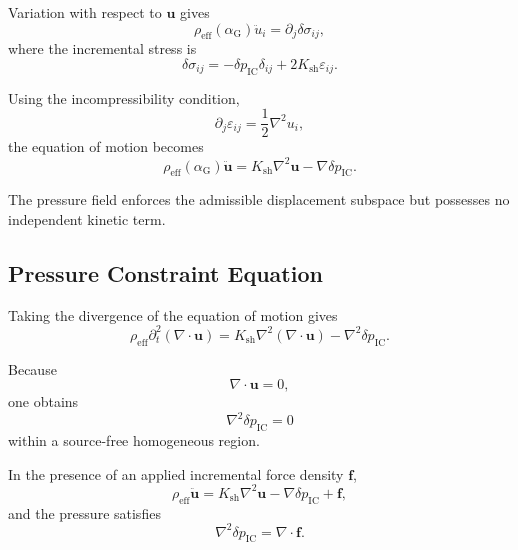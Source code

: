 Variation with respect to $\mathbf{u}$ gives
\begin{equation}
    \rho_{\mathrm{eff}} \left( \alpha_{\mathrm{G}} \right) \ddot{u}_i = \partial_j \delta\sigma_{ij},
\end{equation}
where the incremental stress is
\begin{equation}
    \boxed{ \delta\sigma_{ij} = - \delta p_{\mathrm{IC}} \delta_{ij} + 2K_{\mathrm{sh}} \varepsilon_{ij} }.
\end{equation}

Using the incompressibility condition,
\begin{equation}
    \partial_j\varepsilon_{ij} = \frac{1}{2}\nabla^2 u_i,
\end{equation}
the equation of motion becomes
\begin{equation}
    \boxed{ \rho_{\mathrm{eff}} \left( \alpha_{\mathrm{G}} \right) \ddot{\mathbf{u}} = K_{\mathrm{sh}} \nabla^2\mathbf{u} - \nabla\delta p_{\mathrm{IC}} }.
\end{equation}

The pressure field enforces the admissible displacement subspace but possesses no independent kinetic term.

\subsection{Pressure Constraint Equation}

Taking the divergence of the equation of motion gives
\begin{equation}
    \rho_{\mathrm{eff}} \partial_t^2 \left( \nabla\cdot\mathbf{u} \right) = K_{\mathrm{sh}} \nabla^2 \left( \nabla\cdot\mathbf{u} \right) - \nabla^2\delta p_{\mathrm{IC}}.
\end{equation}

Because
\begin{equation}
    \nabla\cdot\mathbf{u} = 0,
\end{equation}
one obtains
\begin{equation}
    \boxed{ \nabla^2\delta p_{\mathrm{IC}} = 0 }
\end{equation}
within a source-free homogeneous region.

In the presence of an applied incremental force density $\mathbf{f}$,
\begin{equation}
    \rho_{\mathrm{eff}}\ddot{\mathbf{u}} = K_{\mathrm{sh}}\nabla^2\mathbf{u} - \nabla\delta p_{\mathrm{IC}} + \mathbf{f},
\end{equation}
and the pressure satisfies
\begin{equation}
    \boxed{ \nabla^2\delta p_{\mathrm{IC}} = \nabla\cdot\mathbf{f} }.
\end{equation}

